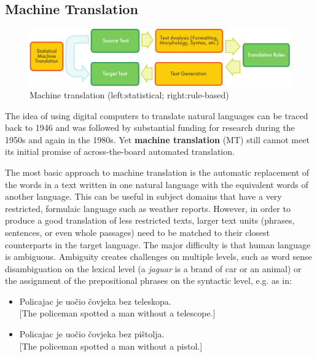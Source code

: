 \begin{multicols}{2}
\subsection{Machine Translation}

\begin{figure}[htb]
  \center
  \includegraphics[width=\textwidth]{../_media/english/machine_translation}
  \caption{Machine translation (left:statistical; right:rule-based)}
  \label{fig:mtarch_en}
\end{figure}

The idea of using digital computers to translate natural languages can be traced back to 1946 and was followed by substantial funding for research during the 1950s and again in the 1980s. Yet \textbf{machine translation} (MT) still cannot meet its initial promise of across-the-board automated translation.
 

The most basic approach to machine translation is the automatic replacement of the words in a text written in one natural language with the equivalent words of another language. This can be useful in subject domains that have a very restricted, formulaic language such as weather reports. However, in order to produce a good translation of less restricted texts, larger text units (phrases, sentences, or even whole passages) need to be matched to their closest counterparts in the target language. The major difficulty is that human language is ambiguous. Ambiguity creates challenges on multiple levels, such as word sense disambiguation on the lexical level (a \emph{jaguar} is a brand of car or an animal) or the assignment of the prepositional phrases on the syntactic level, e.g. as in:

\begin{itemize}
\item Policajac je uočio čovjeka bez teleskopa.\\
  {[}The policeman spotted a man without a telescope.{]} 
\item Policajac je uočio čovjeka bez pištolja.\\
  {[}The policeman spotted a man without a pistol.{]}
\end{itemize}


\end{multicols}
